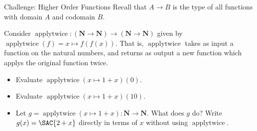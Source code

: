 \documentclass[12pt,letterpaper]{article}
\begin{document}
\begin{problem}{Challenge: Higher Order Functions}
  Recall that \(A \to B\) is the type of all functions with domain \(A\) and codomain \(B\).

  \noindent Consider \(\operatorname{applytwice}: (\mathbf{N} \to \mathbf{N}) \to
  (\mathbf{N} \to \mathbf{N})\) given by
  \(\operatorname{applytwice}(f) = x \mapsto f(f(x))\).
  That is, \(\operatorname{applytwice}\) takes as input a function on the natural numbers,
  and returns as output a new function which applys the original function twice.

  \begin{itemize}
    \item Evaluate \(\operatorname{applytwice}(x\mapsto 1+x)(0)\).
    \item Evaluate \(\operatorname{applytwice}(x\mapsto 1+x)(10)\).
    \item Let \(g = \operatorname{applytwice}(x\mapsto 1+x): \mathbf{N} \to \mathbf{N}\).
    What does \(g\) do? Write \(g(x) = \SAC{2+x}\) directly in terms of \(x\) without using
    \(\operatorname{applytwice}\).
  \end{itemize}
\end{problem}
\end{document}
